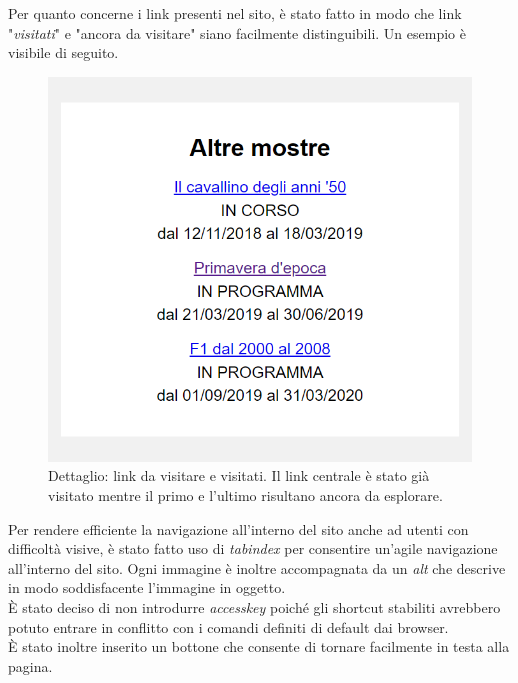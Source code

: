 Per quanto concerne i link presenti nel sito, è stato fatto in modo che link "\textit{visitati}" e "ancora da visitare" siano facilmente distinguibili. Un esempio è visibile di seguito.
\begin{figure}[h]
	\begin{center}
		\includegraphics[scale=1.5]{Images/linkVisitatiDaVisitare.png}
		\caption{Dettaglio: link da visitare e visitati. Il link centrale è stato già visitato mentre il primo e l'ultimo risultano ancora da esplorare.}
	\end{center}
\end{figure}

Per rendere efficiente la navigazione all'interno del sito anche ad utenti con difficoltà visive, è stato fatto uso di \textit{tabindex} per consentire un'agile navigazione all'interno del sito. Ogni immagine è inoltre accompagnata da un \textit{alt} che descrive in modo soddisfacente l'immagine in oggetto.\\
È stato deciso di non introdurre \textit{accesskey} poiché gli shortcut stabiliti avrebbero potuto entrare in conflitto con i comandi definiti di default dai browser.\\
È stato inoltre inserito un bottone che consente di tornare facilmente in testa alla pagina.


